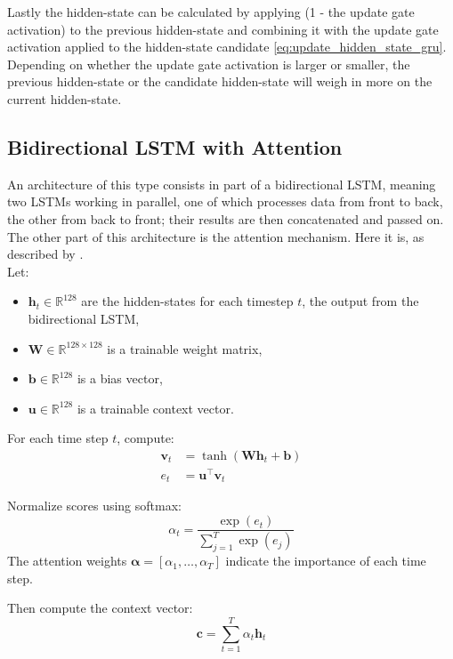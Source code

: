 \documentclass{article}
\begin{document}
Lastly the hidden-state can be calculated by applying (1 - the update gate activation) to the previous hidden-state and combining it with the update gate activation applied to the hidden-state candidate \eqref{eq:update_hidden_state_gru}. Depending on whether the update gate activation is larger or smaller, the previous hidden-state or the candidate hidden-state will weigh in more on the current hidden-state.

\subsection{Bidirectional LSTM with Attention}
An architecture of this type consists in part of a bidirectional LSTM, meaning two LSTMs working in parallel, one of which processes data from front to back, the other from back to front; their results are then concatenated and passed on.
\\[2em]
The other part of this architecture is the attention mechanism. Here it is, as described by \cite{bahdanau2016neuralmachinetranslationjointly}.
\\[2em]
Let:
\begin{itemize}
    \item $\mathbf{h}_t \in \mathbb{R}^{128}$ are the hidden-states for each timestep $t$, the output from the bidirectional LSTM,
    \item $\mathbf{W} \in \mathbb{R}^{128 \times 128}$ is a trainable weight matrix,
    \item $\mathbf{b} \in \mathbb{R}^{128}$ is a bias vector,
    \item $\mathbf{u} \in \mathbb{R}^{128}$ is a trainable context vector.
\end{itemize}

For each time step $t$, compute:
\begin{align}
    \mathbf{v}_t &= \tanh\!\left( \mathbf{W} \mathbf{h}_t + \mathbf{b} \right) \label{eq:v_bahdanau} \\
    e_t &= \mathbf{u}^\top \mathbf{v}_t \label{eq:attention_score}
\end{align}

Normalize scores using softmax:
\begin{equation}
    \alpha_t = \frac{\exp(e_t)}{\sum_{j=1}^{T} \exp(e_j)} \label{eq:alpha_score}
\end{equation}
The attention weights $\boldsymbol{\alpha} = [\alpha_1, \dots, \alpha_T]$ indicate the importance of each time step.

Then compute the context vector:
\begin{equation}
    \mathbf{c} = \sum_{t=1}^{T} \alpha_t \mathbf{h}_t \label{eq:attention_context}
\end{equation}
\end{document}
